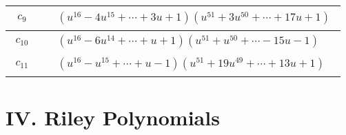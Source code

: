 \documentclass[1p]{elsarticle_modified}
\theoremstyle{definition}
\begin{document}
\begin{tabular}{m{50pt}|m{274pt}}
\hline $$\begin{aligned}c_{9}\end{aligned}$$&$\begin{aligned}
&(u^{16}-4 u^{15}+\cdots+3 u+1)(u^{51}+3 u^{50}+\cdots+17 u+1)
\end{aligned}$\\
\hline $$\begin{aligned}c_{10}\end{aligned}$$&$\begin{aligned}
&(u^{16}-6 u^{14}+\cdots+u+1)(u^{51}+u^{50}+\cdots-15 u-1)
\end{aligned}$\\
\hline $$\begin{aligned}c_{11}\end{aligned}$$&$\begin{aligned}
&(u^{16}- u^{15}+\cdots+u-1)(u^{51}+19 u^{49}+\cdots+13 u+1)
\end{aligned}$\\
\hline
\end{tabular}\newpage\renewcommand{\arraystretch}{1}
\centering \section*{ IV. Riley Polynomials}
\end{document}

